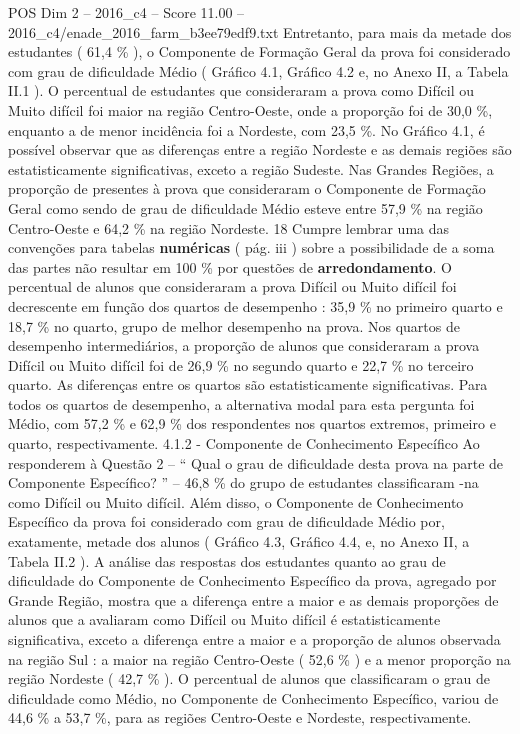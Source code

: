 \begin{textsample}{POS Dim 2 – 2016\_c4 – Score 11.00 – 2016\_c4/enade\_2016\_farm\_b3ee79edf9.txt}
Entretanto, para mais da metade dos estudantes ( 61,4 \% ), o Componente de Formação Geral da prova foi considerado com grau de dificuldade Médio ( Gráfico 4.1, Gráfico 4.2 e, no Anexo II, a Tabela II.1 ).
O percentual de estudantes que consideraram a prova como Difícil ou Muito difícil foi maior na região Centro-Oeste, onde a proporção foi de 30,0 \%, enquanto a de menor incidência foi a Nordeste, com 23,5 \%.
No Gráfico 4.1, é possível observar que as diferenças entre a região Nordeste e as demais regiões são estatisticamente significativas, exceto a região Sudeste.
Nas Grandes Regiões, a proporção de presentes à prova que consideraram o Componente de Formação Geral como sendo de grau de dificuldade Médio esteve entre 57,9 \% na região Centro-Oeste e 64,2 \% na região Nordeste. 18 Cumpre lembrar uma das convenções para tabelas \textbf{numéricas} ( pág. iii ) sobre a possibilidade de a soma das partes não resultar em 100 \% por questões de \textbf{arredondamento}.
O percentual de alunos que consideraram a prova Difícil ou Muito difícil foi decrescente em função dos quartos de desempenho : 35,9 \% no primeiro quarto e 18,7 \% no quarto, grupo de melhor desempenho na prova.
Nos quartos de desempenho intermediários, a proporção de alunos que consideraram a prova Difícil ou Muito difícil foi de 26,9 \% no segundo quarto e 22,7 \% no terceiro quarto.
As diferenças entre os quartos são estatisticamente significativas.
Para todos os quartos de desempenho, a alternativa modal para esta pergunta foi Médio, com 57,2 \% e 62,9 \% dos respondentes nos quartos extremos, primeiro e quarto, respectivamente. 4.1.2 - Componente de Conhecimento Específico Ao responderem à Questão 2 – “ Qual o grau de dificuldade desta prova na parte de Componente Específico? ” – 46,8 \% do grupo de estudantes classificaram -na como Difícil ou Muito difícil.
Além disso, o Componente de Conhecimento Específico da prova foi considerado com grau de dificuldade Médio por, exatamente, metade dos alunos ( Gráfico 4.3, Gráfico 4.4, e, no Anexo II, a Tabela II.2 ).
A análise das respostas dos estudantes quanto ao grau de dificuldade do Componente de Conhecimento Específico da prova, agregado por Grande Região, mostra que a diferença entre a maior e as demais proporções de alunos que a avaliaram como Difícil ou Muito difícil é estatisticamente significativa, exceto a diferença entre a maior e a proporção de alunos observada na região Sul : a maior na região Centro-Oeste ( 52,6 \% ) e a menor proporção na região Nordeste ( 42,7 \% ).
O percentual de alunos que classificaram o grau de dificuldade como Médio, no Componente de Conhecimento Específico, variou de 44,6 \% a 53,7 \%, para as regiões Centro-Oeste e Nordeste, respectivamente.

\end{textsample}
